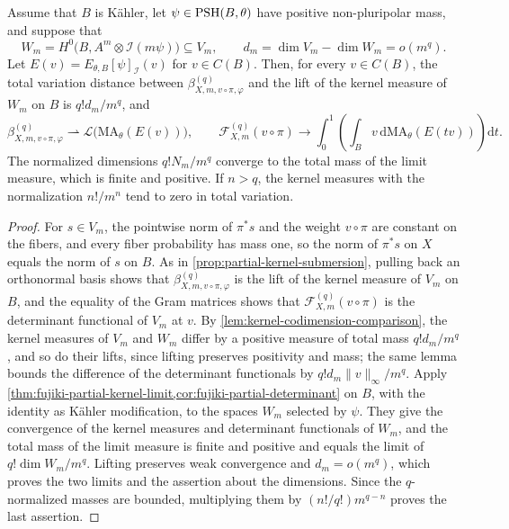 \begin{proposition}\label{prop:descended-kernel-limit}
Assume that $B$ is K\"ahler, let $\psi\in\mathrm{PSH}(B,\theta)$ have positive non-pluripolar mass, and suppose that
\[
 W_m=H^0\bigl(B,A^m\otimes\mathcal I(m\psi)\bigr)\subseteq V_m,
 \qquad d_m=\dim V_m-\dim W_m=o(m^q).
\]
Let $E(v)=E_{\theta,B}[\psi]_{\mathcal I}(v)$ for $v\in C(B)$. Then, for every $v\in C(B)$, the total variation distance between $\beta_{X,m,v\circ\pi,\varphi}^{(q)}$ and the lift of the kernel measure of $W_m$ on $B$ is $q!d_m/m^q$, and
\[
 \beta_{X,m,v\circ\pi,\varphi}^{(q)}
      \rightharpoonup\mathcal L\bigl(\mathrm{MA}_\theta(E(v))\bigr),
 \qquad
 \mathcal F_{X,m}^{(q)}(v\circ\pi)\longrightarrow
 \int_0^1\!\left(\int_B
           v\,\mathrm{d}\mathrm{MA}_\theta(E(tv))\right)\mathrm{d}t.
\]
The normalized dimensions $q!N_m/m^q$ converge to the total mass of the limit measure, which is finite and positive. If $n>q$, the kernel measures with the normalization $n!/m^n$ tend to zero in total variation.
\end{proposition}
\begin{proof}
For $s\in V_m$, the pointwise norm of $\pi^*s$ and the weight $v\circ\pi$ are constant on the fibers, and every fiber probability has mass one, so the norm of $\pi^*s$ on $X$ equals the norm of $s$ on $B$. As in \cref{prop:partial-kernel-submersion}, pulling back an orthonormal basis shows that $\beta_{X,m,v\circ\pi,\varphi}^{(q)}$ is the lift of the kernel measure of $V_m$ on $B$, and the equality of the Gram matrices shows that $\mathcal F_{X,m}^{(q)}(v\circ\pi)$ is the determinant functional of $V_m$ at $v$. By \cref{lem:kernel-codimension-comparison}, the kernel measures of $V_m$ and $W_m$ differ by a positive measure of total mass $q!d_m/m^q$, and so do their lifts, since lifting preserves positivity and mass; the same lemma bounds the difference of the determinant functionals by $q!d_m\|v\|_\infty/m^q$. Apply \cref{thm:fujiki-partial-kernel-limit,cor:fujiki-partial-determinant} on $B$, with the identity as K\"ahler modification, to the spaces $W_m$ selected by $\psi$. They give the convergence of the kernel measures and determinant functionals of $W_m$, and the total mass of the limit measure is finite and positive and equals the limit of $q!\dim W_m/m^q$. Lifting preserves weak convergence and $d_m=o(m^q)$, which proves the two limits and the assertion about the dimensions. Since the $q$-normalized masses are bounded, multiplying them by $(n!/q!)m^{q-n}$ proves the last assertion.
\end{proof}

